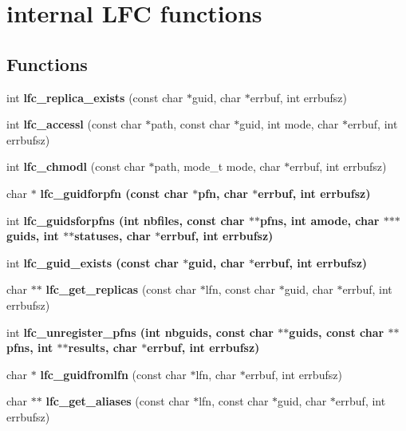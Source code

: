 \section{internal LFC functions}
\label{group__lfc__low__group}
\subsection*{Functions}
\begin{CompactItemize}
\item 
int \textbf{lfc\_\-replica\_\-exists} (const char $\ast$guid, char $\ast$errbuf, int errbufsz)\label{group__lfc__low__group_g4fa605c700ac841df98ffb1b4f2d0ecb}

\item 
int \textbf{lfc\_\-accessl} (const char $\ast$path, const char $\ast$guid, int mode, char $\ast$errbuf, int errbufsz)\label{group__lfc__low__group_g145e85cc530b23736eea535580c4e5e3}

\item 
int \textbf{lfc\_\-chmodl} (const char $\ast$path, mode\_\-t mode, char $\ast$errbuf, int errbufsz)\label{group__lfc__low__group_g45d447082c9b4e1a47684a43f198d2e4}

\item 
char $\ast$ \bf{lfc\_\-guidforpfn} (const char $\ast$pfn, char $\ast$errbuf, int errbufsz)
\item 
int \bf{lfc\_\-guidsforpfns} (int nbfiles, const char $\ast$$\ast$pfns, int amode, char $\ast$$\ast$$\ast$guids, int $\ast$$\ast$statuses, char $\ast$errbuf, int errbufsz)
\item 
int \bf{lfc\_\-guid\_\-exists} (const char $\ast$guid, char $\ast$errbuf, int errbufsz)
\item 
char $\ast$$\ast$ \textbf{lfc\_\-get\_\-replicas} (const char $\ast$lfn, const char $\ast$guid, char $\ast$errbuf, int errbufsz)\label{group__lfc__low__group_g942218fc4c4fa95df2bf10db3f3fad75}

\item 
int \bf{lfc\_\-unregister\_\-pfns} (int nbguids, const char $\ast$$\ast$guids, const char $\ast$$\ast$pfns, int $\ast$$\ast$results, char $\ast$errbuf, int errbufsz)
\item 
char $\ast$ \textbf{lfc\_\-guidfromlfn} (const char $\ast$lfn, char $\ast$errbuf, int errbufsz)\label{group__lfc__low__group_g338e9042e72eeffa51e27beca09675c4}

\item 
char $\ast$$\ast$ \textbf{lfc\_\-get\_\-aliases} (const char $\ast$lfn, const char $\ast$guid, char $\ast$errbuf, int errbufsz)\label{group__lfc__low__group_g546944558296f5a894005368c236cccf}


\end{CompactItemize}
